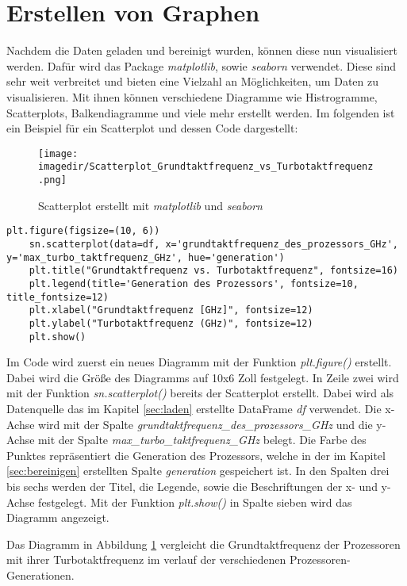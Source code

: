 \section{Erstellen von Graphen}
Nachdem die Daten geladen und bereinigt wurden, können diese nun visualisiert werden. Dafür wird das Package \textit{matplotlib}, sowie \textit{seaborn} verwendet.
Diese sind sehr weit verbreitet und bieten eine Vielzahl an Möglichkeiten, um Daten zu visualisieren. Mit ihnen können verschiedene Diagramme wie Histrogramme,
Scatterplots, Balkendiagramme und viele mehr erstellt werden. Im folgenden ist ein Beispiel für ein Scatterplot und dessen Code dargestellt:

\begin{figure}[H]
	\centering 
	\texttt{[image: \\imagedir/Scatterplot\_Grundtaktfrequenz\_vs\_Turbotaktfrequenz.png]} 
	\captionsetup{format=hang}
	\caption[Scatterplot]{\label{fig:scatterplot_Grundtaktfrequenz}Scatterplot erstellt mit \textit{matplotlib} und \textit{seaborn}}
\end{figure}

\begin{lstlisting}[caption={\texttt{Code für den Scatterplot in Figur 5.1}},captionpos=b]
    plt.figure(figsize=(10, 6))
    sn.scatterplot(data=df, x='grundtaktfrequenz_des_prozessors_GHz', y='max_turbo_taktfrequenz_GHz', hue='generation')
    plt.title("Grundtaktfrequenz vs. Turbotaktfrequenz", fontsize=16)
    plt.legend(title='Generation des Prozessors', fontsize=10, title_fontsize=12)
    plt.xlabel("Grundtaktfrequenz [GHz]", fontsize=12)
    plt.ylabel("Turbotaktfrequenz (GHz)", fontsize=12)
    plt.show()
\end{lstlisting}

Im Code wird zuerst ein neues Diagramm mit der Funktion \textit{plt.figure()} erstellt. Dabei wird die Größe des Diagramms auf 10x6 Zoll festgelegt. In Zeile
zwei wird mit der Funktion \textit{sn.scatterplot()} bereits der Scatterplot erstellt. Dabei wird als Datenquelle das im Kapitel \ref{sec:laden} erstellte DataFrame
\textit{df} verwendet. Die x-Achse wird mit der Spalte \textit{grundtaktfrequenz\_des\_prozessors\_GHz} und die y-Achse mit der Spalte \textit{max\_turbo\_taktfrequenz\_GHz}
belegt. Die Farbe des Punktes repräsentiert die Generation des Prozessors, welche in der im Kapitel \ref{sec:bereinigen} erstellten Spalte \textit{generation} gespeichert ist.
In den Spalten drei bis sechs werden der Titel, die Legende, sowie die Beschriftungen der x- und y-Achse festgelegt. Mit der Funktion \textit{plt.show()} in Spalte sieben wird
das Diagramm angezeigt.

Das Diagramm in Abbildung \ref{fig:scatterplot_Grundtaktfrequenz} vergleicht die Grundtaktfrequenz der Prozessoren mit ihrer Turbotaktfrequenz im verlauf der
verschiedenen Prozessoren-Generationen.